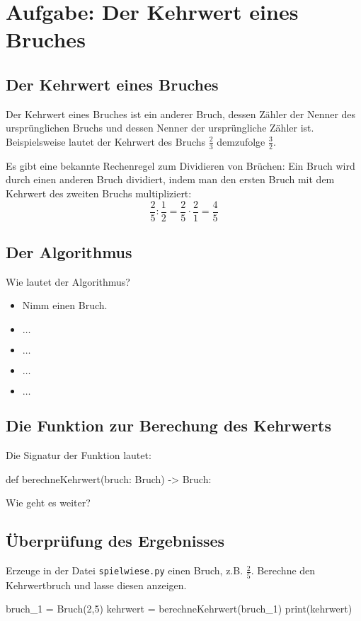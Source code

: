 \section{Aufgabe: Der Kehrwert eines Bruches}

\subsection{Der Kehrwert eines Bruches}

Der Kehrwert eines Bruches ist ein anderer Bruch, dessen Zähler der Nenner des ursprünglichen Bruchs und dessen Nenner der ursprüngliche Zähler ist. Beispielsweise lautet der Kehrwert des Bruchs $\frac{2}{3}$ demzufolge $\frac{3}{2}$.

Es gibt eine bekannte Rechenregel zum Dividieren von Brüchen: Ein Bruch wird durch einen anderen Bruch dividiert, indem man den ersten Bruch mit dem Kehrwert des zweiten Bruchs multipliziert:
\[
\frac{2}{5} : \frac{1}{2} = \frac{2}{5} \cdot \frac{2}{1} = \frac{4}{5}
\]

\subsection{Der Algorithmus}

Wie lautet der Algorithmus?
\begin{itemize}
	\item Nimm einen Bruch.
	\item $\dots$
	\item $\dots$
	\item $\dots$
	\item $\dots$
\end{itemize}

\subsection{Die Funktion zur Berechung des Kehrwerts}

Die Signatur der Funktion lautet:

\begin{codePython}
def berechneKehrwert(bruch: Bruch) -> Bruch:
\end{codePython}

Wie geht es weiter?

\subsection{Überprüfung des Ergebnisses}

Erzeuge in der Datei \texttt{spielwiese.py} einen Bruch, z.B. $\frac{2}{5}$. Berechne den Kehrwertbruch und lasse diesen anzeigen.

\begin{codePython}
bruch_1 = Bruch(2,5)
kehrwert = berechneKehrwert(bruch_1)
print(kehrwert)
\end{codePython}



